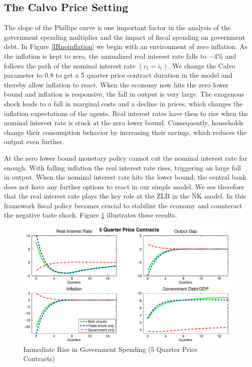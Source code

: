 \documentclass[12pt,a4paper,oneside,titlepage]{article}
\begin{document}
\subsection*{The Calvo Price Setting}
The slope of the Phillips curve is one important factor in the analysis of the government spending multiplier and the impact of fiscal spending on government debt. In Figure \ref{IRnoinflation} we begin with an environment of zero inflation.
As the inflation is kept to zero, the annualized real interest rate falls to $-4\%$ and follows the path of the nominal interest rate $\left(r_t = i_t\right)$. We change the Calvo parameter to 0.8 to get a 5 quarter price contract duration in the model and thereby allow inflation to react. When the economy now hits the zero lower bound and inflation is responsive, the fall in output is very large. The exogenous shock leads to a fall in marginal costs and a decline in prices, which changes the inflation expectations of the agents. Real interest rates have then to rise when the nominal interest rate is stuck at the zero lower bound. Consequently, households change their consumption behavior by increasing their savings, which reduces the output even further.
\par
\bigskip
At the zero lower bound monetary policy cannot cut the nominal interest rate far enough. With falling inflation the real interest rate rises, triggering an large fall in output. When the nominal interest rate hits the lower bound, the central bank does not have any further options to react in our simple model. We see therefore that the real interest rate plays the key role at the ZLB in the NK model. In this framework fiscal policy becomes crucial to stabilize the economy and counteract the negative taste shock. Figure \ref{IR5quarter} illustrates these results.

\begin{figure}[!th]
\includegraphics[width=\textwidth]{Paperpics/Figure25quarter}
\caption{Immediate Rise in Government Spending (5 Quarter Price Contracts)}
\label{IR5quarter}
\end{figure}
\end{document}
